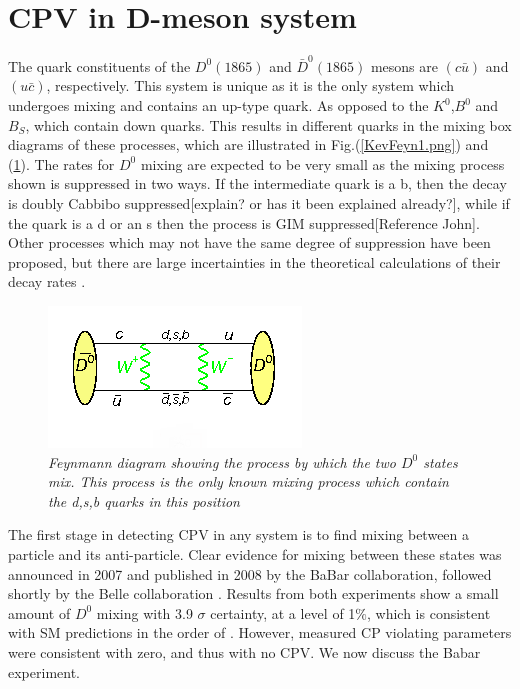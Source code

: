 \section{CPV in D-meson system}

The quark constituents of the $D^{0}(1865)$ and $\bar{D}^{0}(1865)$ mesons are $(c \bar{u})$ and $(u \bar{c})$, respectively. This system is unique as it is the only system which undergoes mixing and contains an up-type quark. As opposed to the $K^{0}$,$B^{0}$ and $B_{S}$, which contain down quarks. This results in different quarks in the mixing box diagrams of these processes, which are illustrated in Fig.(\ref{KevFeyn1.png}) and (\ref{Deon_Mixing_Feyn}). The rates for $D^0$ mixing are expected to be very small as the mixing process shown is suppressed in two ways. If the intermediate quark is a b, then the decay is doubly Cabbibo suppressed[explain? or has it been explained already?], while if the quark is a d or an s then the process is GIM suppressed[Reference John]. Other processes which may not have the same degree of suppression have been proposed, but there are large incertainties in the theoretical calculations of their decay rates \cite{Babar_D0_Review}.    

\begin{figure}[h!]
\begin{center}
\includegraphics[scale=0.8]{figs/Deon_mixing_feyn.png}
\end{center}
\caption{\textit{Feynmann diagram showing the process by which the two $D^{0}$ states mix. This process is the only known mixing process which contain the d,s,b quarks in this position \cite{Deon_Mixing_Feyn}}}
\label{Deon_Mixing_Feyn}
\end{figure}

The first stage in detecting CPV in any system is to find mixing between a particle and its anti-particle. Clear evidence for mixing between these states was announced in 2007 and published in 2008 by the BaBar collaboration, followed shortly by the Belle collaboration \cite{BabarD0mixing}\cite{BelleD0mixing}. Results from both experiments show a small amount of $D^{0}$ mixing with 3.9 $\sigma$ certainty, at a level of 1$\%$, which is consistent with SM predictions in the order of  \cite{Babar_D0_Review}. However, measured CP violating parameters were consistent with zero, and thus with no CPV. We now discuss the Babar experiment.

